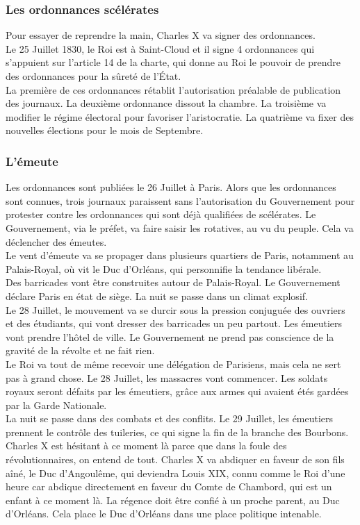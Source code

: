 \documentclass[10pt, a4paper, openany]{book}
\begin{document}
\subsubsection{Les ordonnances scélérates}

Pour essayer de reprendre la main, Charles X va signer des ordonnances. \\
Le 25 Juillet 1830, le Roi est à Saint-Cloud et il signe 4 ordonnances qui s'appuient sur l'article 14 de la charte, qui donne au Roi le pouvoir de prendre des ordonnances pour la sûreté de l'État. \\
La première de ces ordonnances rétablit l'autorisation préalable de publication des journaux. La deuxième ordonnance dissout la chambre. La troisième va modifier le régime électoral pour favoriser l'aristocratie. La quatrième va fixer des nouvelles élections pour le mois de Septembre. 


\subsubsection{L'émeute}

Les ordonnances sont publiées le 26 Juillet à Paris. Alors que les ordonnances sont connues, trois journaux paraissent sans l'autorisation du Gouvernement pour protester contre les ordonnances qui sont déjà qualifiées de scélérates. Le Gouvernement, via le préfet, va faire saisir les rotatives, au vu du peuple. Cela va déclencher des émeutes. \\
Le vent d'émeute va se propager dans plusieurs quartiers de Paris, notamment au Palais-Royal, où vit le Duc d'Orléans, qui personnifie la tendance libérale. \\
Des barricades vont être construites autour de Palais-Royal. Le Gouvernement déclare Paris en état de siège. La nuit se passe dans un climat explosif. \\
Le 28 Juillet, le mouvement va se durcir sous la pression conjuguée des ouvriers et des étudiants, qui vont dresser des barricades un peu partout. Les émeutiers vont prendre l'hôtel de ville. Le Gouvernement ne prend pas conscience de la gravité de la révolte et ne fait rien. \\
Le Roi va tout de même recevoir une délégation de Parisiens, mais cela ne sert pas à grand chose. Le 28 Juillet, les massacres vont commencer. Les soldats royaux seront défaits par les émeutiers, grâce aux armes qui avaient étés gardées par la Garde Nationale. \\
La nuit se passe dans des combats et des conflits. Le 29 Juillet, les émeutiers prennent le contrôle des tuileries, ce qui signe la fin de la branche des Bourbons. Charles X est hésitant à ce moment là parce que dans la foule des révolutionnaires, on entend de tout. Charles X va abdiquer en faveur de son fils aîné, le Duc d'Angoulême, qui deviendra Louis XIX, connu comme le Roi d'une heure car abdique directement en faveur du Comte de Chambord, qui est un enfant à ce moment là. La régence doit être confié à un proche parent, au Duc d'Orléans. Cela place le Duc d'Orléans dans une place politique intenable. 
\end{document}
